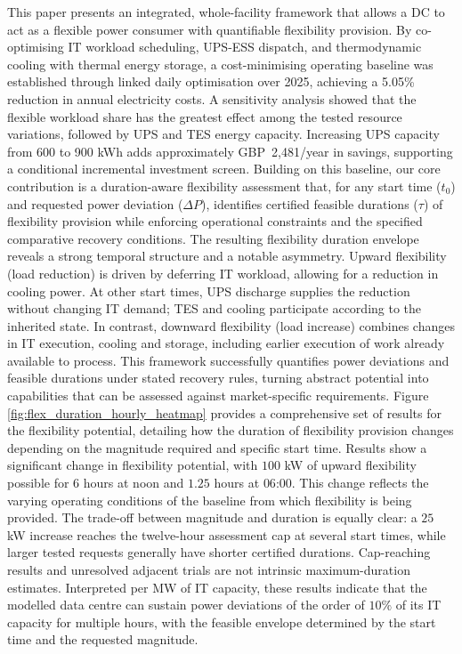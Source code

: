 \documentclass[lettersize,journal]{IEEEtran}
\newcommand{\rev}[1]{#1}
\begin{document}
This paper presents an integrated, whole-facility framework that allows a DC to act as a flexible power consumer with quantifiable flexibility provision. By co-optimising IT workload scheduling, UPS-ESS dispatch, and thermodynamic cooling with thermal energy storage, a cost-minimising operating baseline was established through linked daily optimisation over 2025, achieving a \rev{5.05\% reduction in annual electricity costs. A sensitivity analysis showed that the flexible workload share has the greatest effect among the tested resource variations, followed by UPS and TES energy capacity. Increasing UPS capacity from 600 to 900 kWh adds approximately GBP~2,481/year in savings, supporting a conditional incremental investment screen.} Building on this baseline, our core contribution is a duration-aware flexibility assessment that, for any start time ($t_0$) and requested power deviation ($\Delta P$), identifies certified feasible durations ($\tau$) of flexibility provision while enforcing operational constraints and the specified comparative recovery conditions. The resulting flexibility duration envelope reveals a strong temporal structure and a notable asymmetry. Upward flexibility (load reduction) is driven by deferring IT workload, allowing for a reduction in cooling power. At other start times, UPS discharge supplies the reduction without changing IT demand; TES and cooling participate according to the inherited state. In contrast, downward flexibility (load increase) combines changes in IT execution, cooling and storage, including earlier execution of work already available to process. This framework successfully quantifies power deviations and feasible durations under stated recovery rules, turning abstract potential into capabilities that can be assessed against market-specific requirements. Figure \ref{fig:flex_duration_hourly_heatmap} provides a comprehensive set of results for the flexibility potential, detailing how the duration of flexibility provision changes depending on the magnitude required and specific start time. Results show a significant change in flexibility potential, with $100$ kW of upward flexibility possible for $6$ hours at noon and $1.25$ hours at $06$:$00$. This change reflects the varying operating conditions of the baseline from which flexibility is being provided. \rev{The trade-off between magnitude and duration is equally clear: a $25$ kW increase reaches the twelve-hour assessment cap at several start times, while larger tested requests generally have shorter certified durations. Cap-reaching results and unresolved adjacent trials are not intrinsic maximum-duration estimates. Interpreted per MW of IT capacity, these results indicate that the modelled data centre can sustain power deviations of the order of $10\%$ of its IT capacity for multiple hours, with the feasible envelope determined by the start time and the requested magnitude.}
\end{document}
